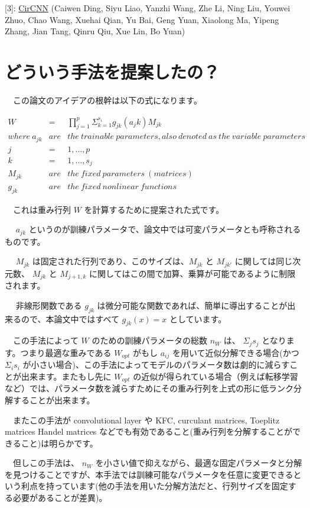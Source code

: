 \documentclass{article}
\begin{document}
[3]: \href{https://arxiv.org/abs/1708.08917}{CirCNN} (Caiwen Ding, Siyu Liao, Yanzhi Wang, Zhe Li, Ning Liu, Youwei Zhuo, Chao Wang, Xuehai Qian, Yu Bai, Geng Yuan, Xiaolong Ma, Yipeng Zhang, Jian Tang, Qinru Qiu, Xue Lin, Bo Yuan)
\section{どういう手法を提案したの？}
\label{sec:org993b09f}
　この論文のアイデアの根幹は以下の式になります。

\begin{eqnarray}
W &=& \prod_{j=1}^{p}\Sigma_{k=1}^{s_i} g_{jk} (a_jk) M_{jk}\\
where\ a_{jk} &are&  the\ trainable\ parameters, also\ denoted\ as\ the\ variable\ parameters \nonumber \\
j &=& 1,\dots, p \nonumber \\
k &=& 1,\dots, s_j \nonumber \\
M_{jk} &are& the\ fixed\ parameters\ (matrices) \nonumber \\
g_{jk} &are& the\ fixed\ nonlinear\ functions \nonumber
\end{eqnarray}

　これは重み行列 \(W\) を計算するために提案された式です。

　 \(a_{jk}\) というのが訓練パラメータで、論文中では可変パラメータとも呼称されるものです。

　 \(M_{jk}\) は固定された行列であり、このサイズは、\(M_{jk}\) と \(M_{jk'}\) に関しては同じ次元数、 \(M_{jk}\) と \({M_{j+1, k}}\) に関してはこの間で加算、乗算が可能であるように制限されます。

　 非線形関数である \(g_{jk}\) は微分可能な関数であれば、簡単に導出することが出来るので、本論文中ではすべて \(g_{jk}(x) = x\) としています。

　この手法によって \(W\) のための訓練パラメータの総数 \(n_W\) は、 \(\Sigma_j {s_j}\) となります。つまり最適な重みである \(W_{opt}\) がもし \(a_{ij}\) を用いて近似分解できる場合(かつ \(\Sigma_{i} s_i\) が小さい場合)、この手法によってモデルのパラメータ数は劇的に減らすことが出来ます。またもし先に \(W_{opt}\) の近似が得られている場合（例えば転移学習など）では、パラメータ数を減らすためにその重み行列を上式の形に低ランク分解することが出来ます。

　またこの手法が convolutional layer や KFC, curculant matrices, Toeplitz matrices Handel matrices などでも有効であること(重み行列を分解することができること)は明らかです。

　但しこの手法は、 \(n_W\) を小さい値で抑えながら、最適な固定パラメータと分解を見つけることですが、本手法では訓練可能なパラメータを任意に変更できるという利点を持っています(他の手法を用いた分解方法だと、行列サイズを固定する必要があることが差異)。
\end{document}
